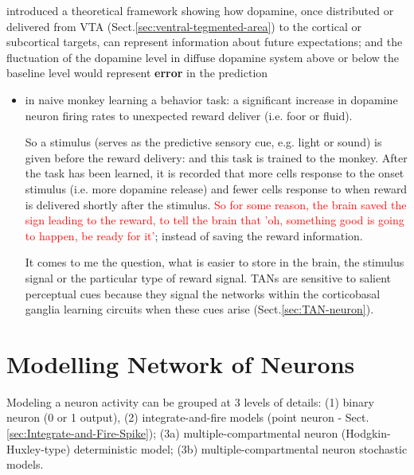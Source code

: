 \citep{montague1996} introduced a theoretical framework showing how dopamine,
once distributed or delivered from VTA (Sect.\ref{sec:ventral-tegmented-area})
to the cortical or subcortical targets, can represent information about future
expectations; and the fluctuation of the dopamine level in diffuse dopamine
system above or below the baseline level would represent {\bf error} in the
prediction

\begin{itemize}
  \item in naive monkey learning a behavior task: a significant increase in
  dopamine neuron firing rates  to unexpected reward deliver (i.e. foor or
  fluid).
  
  So a stimulus (serves as the predictive sensory cue, e.g. light or sound) is
  given before the reward delivery: and this task is trained to the monkey. 
  After the task has been learned, it is recorded that more cells response to
  the onset stimulus (i.e. more dopamine release) and fewer cells response to
  when reward is delivered shortly after the stimulus.
  \textcolor{red}{So for some reason, the brain saved the sign leading to the
  reward, to tell the brain that 'oh, something good is going to happen, be
  ready for it'}; instead of saving the reward information.
  
  It comes to me the question, what is easier to store in the brain, the
  stimulus signal or the particular type of reward signal.
  TANs are sensitive to   salient   perceptual   cues   because   they   signal 
   the networks   within   the   corticobasal   ganglia   learning circuits 
   when these  cues  arise (Sect.\ref{sec:TAN-neuron}).
  
  
\end{itemize}

\chapter{Modelling Network of Neurons}
\label{chap:modeling-network-neurons}



Modeling a neuron activity can be grouped at 3 levels of details:
(1) binary neuron (0 or 1 output), (2) integrate-and-fire
models (point neuron - Sect.\ref{sec:Integrate-and-Fire-Spike}); (3a)
multiple-compartmental neuron (Hodgkin-Huxley-type) deterministic model; (3b) 
multiple-compartmental neuron stochastic models.

